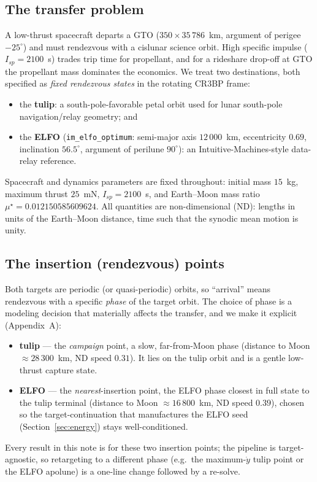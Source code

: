 \documentclass[11pt]{article}
\newcommand{\code}[1]{\texttt{\small #1}}
\newcommand{\muS}{\mu^\star}
\begin{document}
\subsection{The transfer problem}
A low-thrust spacecraft departs a GTO ($350\times35\,786$~km, argument of
perigee $-25^\circ$) and must rendezvous with a cislunar science orbit. High
specific impulse ($I_{sp}=2100$~s) trades trip time for propellant, and for a
rideshare drop-off at GTO the propellant mass dominates the economics. We treat
two destinations, both specified as \emph{fixed rendezvous states} in the
rotating CR3BP frame:
\begin{itemize}
  \item the \textbf{tulip}: a south-pole-favorable petal orbit used for lunar
        south-pole navigation/relay geometry; and
  \item the \textbf{ELFO} (\code{im\_elfo\_optimum}: semi-major axis
        $12\,000$~km, eccentricity $0.69$, inclination $56.5^\circ$, argument of
        perilune $90^\circ$): an Intuitive-Machines-style data-relay reference.
\end{itemize}
Spacecraft and dynamics parameters are fixed throughout: initial mass $15$~kg,
maximum thrust $25$~mN, $I_{sp}=2100$~s, and Earth--Moon mass ratio
$\muS = 0.012150585609624$. All quantities are non-dimensional (ND): lengths in
units of the Earth--Moon distance, time such that the synodic mean motion is
unity.

\subsection{The insertion (rendezvous) points}\label{sec:insertion}
Both targets are periodic (or quasi-periodic) orbits, so ``arrival'' means
rendezvous with a specific \emph{phase} of the target orbit. The choice of
phase is a modeling decision that materially affects the transfer, and we make
it explicit (Appendix~A):
\begin{itemize}
  \item \textbf{tulip} --- the \emph{campaign} point, a slow, far-from-Moon
        phase (distance to Moon $\approx 28\,300$~km, ND speed $0.31$). It lies
        on the tulip orbit and is a gentle low-thrust capture state.
  \item \textbf{ELFO} --- the \emph{nearest}-insertion point, the ELFO phase
        closest in full state to the tulip terminal (distance to Moon
        $\approx 16\,800$~km, ND speed $0.39$), chosen so the target-continuation
        that manufactures the ELFO seed (Section~\ref{sec:energy}) stays
        well-conditioned.
\end{itemize}
Every result in this note is for these two insertion points; the pipeline is
target-agnostic, so retargeting to a different phase (e.g.\ the maximum-$\dot y$
tulip point or the ELFO apolune) is a one-line change followed by a re-solve.
\end{document}

